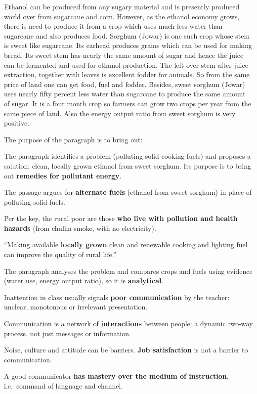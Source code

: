 Ethanol can be produced from any sugary material and is presently produced world over from sugarcane and corn. However, as the ethanol economy grows, there is need to produce it from a crop which uses much less water than sugarcane and also produces food. Sorghum (Jowar) is one such crop whose stem is sweet like sugarcane. Its earhead produces grains which can be used for making bread. Its sweet stem has nearly the same amount of sugar and hence the juice can be fermented and used for ethanol production. The left-over stem after juice extraction, together with leaves is excellent fodder for animals. So from the same price of land one can get food, fuel and fodder. Besides, sweet sorghum (Jowar) uses nearly fifty percent less water than sugarcane to produce the same amount of sugar. It is a four month crop so farmers can grow two crops per year from the same piece of land. Also the energy output ratio from sweet sorghum is very positive.

The purpose of the paragraph is to bring out:

The paragraph identifies a problem (polluting solid cooking fuels) and proposes a solution: clean, locally grown ethanol from sweet sorghum. Its purpose is to bring out \textbf{remedies for pollutant energy}.

The passage argues for \textbf{alternate fuels} (ethanol from sweet sorghum) in place of polluting solid fuels.

Per the key, the rural poor are those \textbf{who live with pollution and health hazards} (from chulha smoke, with no electricity).

``Making available \textbf{locally grown} clean and renewable cooking and lighting fuel can improve the quality of rural life.''

The paragraph analyses the problem and compares crops and fuels using evidence (water use, energy output ratio), so it is \textbf{analytical}.

Inattention in class usually signals \textbf{poor communication} by the teacher: unclear, monotonous or irrelevant presentation.

Communication is a network of \textbf{interactions} between people: a dynamic two-way process, not just messages or information.

Noise, culture and attitude can be barriers. \textbf{Job satisfaction} is not a barrier to communication.

A good communicator \textbf{has mastery over the medium of instruction}, i.e.\ command of language and channel.

